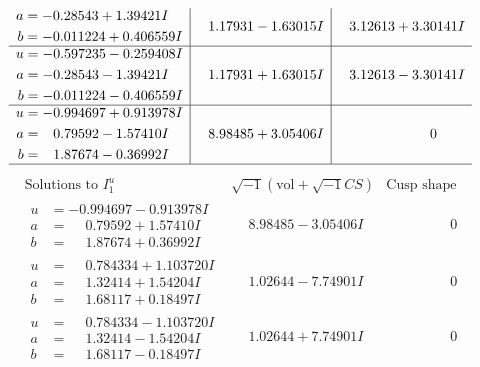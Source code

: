 \documentclass[1p]{elsarticle_modified}
\theoremstyle{definition}
\newcommand{\I}{\sqrt{-1}}
\begin{document}
$$\begin{array}{c|c|c}
\begin{aligned}
a &= -0.28543 + 1.39421 I \\
b &= -0.011224 + 0.406559 I\end{aligned}
 & \phantom{-}1.17931 - 1.63015 I & \phantom{-}3.12613 + 3.30141 I \\ \hline\begin{aligned}
u &= -0.597235 - 0.259408 I \\
a &= -0.28543 - 1.39421 I \\
b &= -0.011224 - 0.406559 I\end{aligned}
 & \phantom{-}1.17931 + 1.63015 I & \phantom{-}3.12613 - 3.30141 I \\ \hline\begin{aligned}
u &= -0.994697 + 0.913978 I \\
a &= \phantom{-}0.79592 - 1.57410 I \\
b &= \phantom{-}1.87674 - 0.36992 I\end{aligned}
 & \phantom{-}8.98485 + 3.05406 I & \phantom{-0.000000 } 0\\
 \hline 
 \end{array}$$\newpage$$\begin{array}{c|c|c}  
\text{Solutions to }I^u_{1}& \I (\text{vol} + \sqrt{-1}CS) & \text{Cusp shape}\\
 \hline 
\begin{aligned}
u &= -0.994697 - 0.913978 I \\
a &= \phantom{-}0.79592 + 1.57410 I \\
b &= \phantom{-}1.87674 + 0.36992 I\end{aligned}
 & \phantom{-}8.98485 - 3.05406 I & \phantom{-0.000000 } 0 \\ \hline\begin{aligned}
u &= \phantom{-}0.784334 + 1.103720 I \\
a &= \phantom{-}1.32414 + 1.54204 I \\
b &= \phantom{-}1.68117 + 0.18497 I\end{aligned}
 & \phantom{-}1.02644 - 7.74901 I & \phantom{-0.000000 } 0 \\ \hline\begin{aligned}
u &= \phantom{-}0.784334 - 1.103720 I \\
a &= \phantom{-}1.32414 - 1.54204 I \\
b &= \phantom{-}1.68117 - 0.18497 I\end{aligned}
 & \phantom{-}1.02644 + 7.74901 I & \phantom{-0.000000 } 0 \\ \hline\begin{aligned}

\end{aligned}
\end{array}$$
\end{document}
